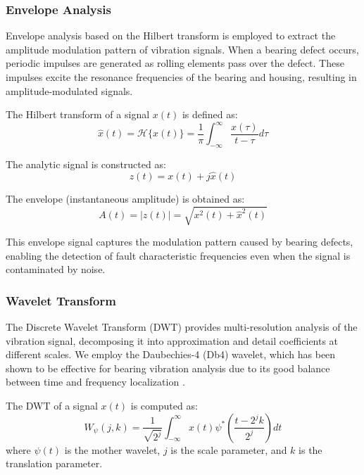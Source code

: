 \documentclass[conference,twocolumn]{IEEEtran}
\begin{document}
\subsubsection{Envelope Analysis}

Envelope analysis based on the Hilbert transform is employed to extract the amplitude modulation pattern of vibration signals. When a bearing defect occurs, periodic impulses are generated as rolling elements pass over the defect. These impulses excite the resonance frequencies of the bearing and housing, resulting in amplitude-modulated signals.

The Hilbert transform of a signal $x(t)$ is defined as:
\begin{equation}
    \hat{x}(t) = \mathcal{H}\{x(t)\} = \frac{1}{\pi} \int_{-\infty}^{\infty} \frac{x(\tau)}{t - \tau} d\tau
\end{equation}

The analytic signal is constructed as:
\begin{equation}
    z(t) = x(t) + j\hat{x}(t)
\end{equation}

The envelope (instantaneous amplitude) is obtained as:
\begin{equation}
    A(t) = |z(t)| = \sqrt{x^2(t) + \hat{x}^2(t)}
\end{equation}

This envelope signal captures the modulation pattern caused by bearing defects, enabling the detection of fault characteristic frequencies even when the signal is contaminated by noise.

\subsubsection{Wavelet Transform}

The Discrete Wavelet Transform (DWT) provides multi-resolution analysis of the vibration signal, decomposing it into approximation and detail coefficients at different scales. We employ the Daubechies-4 (Db4) wavelet, which has been shown to be effective for bearing vibration analysis due to its good balance between time and frequency localization \cite{kumar2013wavelet}.

The DWT of a signal $x(t)$ is computed as:
\begin{equation}
    W_{\psi}(j, k) = \frac{1}{\sqrt{2^j}} \int_{-\infty}^{\infty} x(t) \psi^*\left(\frac{t - 2^j k}{2^j}\right) dt
\end{equation}
where $\psi(t)$ is the mother wavelet, $j$ is the scale parameter, and $k$ is the translation parameter.
\end{document}
